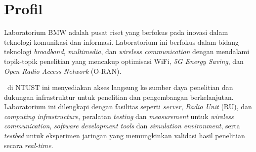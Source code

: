 \section{Profil \namaLab}

Laboratorium BMW adalah pusat riset yang berfokus pada inovasi dalam teknologi komunikasi dan informasi. Laboratorium ini berfokus dalam bidang teknologi \textit{broadband}, \textit{multimedia}, dan \textit{wireless communication} dengan mendalami topik-topik penelitian yang mencakup optimisasi WiFi, \textit{5G Energy Saving}, dan \textit{Open Radio Access Network} (O-RAN).

\namaLab \ di NTUST ini menyediakan akses langsung ke sumber daya penelitian dan dukungan infrastruktur untuk penelitian dan pengembangan berkelanjutan. Laboratorium ini dilengkapi dengan fasilitas seperti \textit{server}, \textit{Radio Unit} (RU), dan \textit{computing infrastructure}, peralatan \textit{testing} dan \textit{measurement} untuk \textit{wireless communication}, \textit{software development tools} dan \textit{simulation environment}, serta \textit{testbed} untuk eksperimen jaringan yang memungkinkan validasi hasil penelitian secara \textit{real-time}.

